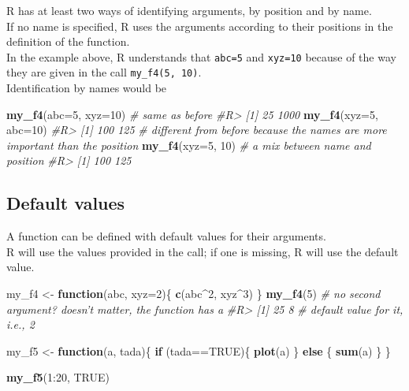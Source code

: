 \documentclass[]{book}
\newenvironment{Shaded}{}{}
\newcommand{\CommentTok}[1]{\textcolor[rgb]{0.38,0.63,0.69}{\textit{#1}}}
\newcommand{\ControlFlowTok}[1]{\textcolor[rgb]{0.00,0.44,0.13}{\textbf{#1}}}
\newcommand{\DataTypeTok}[1]{\textcolor[rgb]{0.56,0.13,0.00}{#1}}
\newcommand{\DecValTok}[1]{\textcolor[rgb]{0.25,0.63,0.44}{#1}}
\newcommand{\KeywordTok}[1]{\textcolor[rgb]{0.00,0.44,0.13}{\textbf{#1}}}
\newcommand{\NormalTok}[1]{#1}
\newcommand{\OperatorTok}[1]{\textcolor[rgb]{0.40,0.40,0.40}{#1}}
\newcommand{\OtherTok}[1]{\textcolor[rgb]{0.00,0.44,0.13}{#1}}
\newcommand{\StringTok}[1]{\textcolor[rgb]{0.25,0.44,0.63}{#1}}
\theoremstyle{definition}
\theoremstyle{definition}
\theoremstyle{definition}
\theoremstyle{remark}
\begin{document}
R has at least two ways of identifying arguments, by position and by
name.\\
If no name is specified, R uses the arguments according to their
positions in the definition of the function.\\
In the example above, R understands that \texttt{abc=5} and
\texttt{xyz=10} because of the way they are given in the call
\texttt{my\_f4(5,\ 10)}.\\
Identification by names would be

\begin{Shaded}
\begin{Highlighting}[]
\KeywordTok{my_f4}\NormalTok{(}\DataTypeTok{abc=}\DecValTok{5}\NormalTok{, }\DataTypeTok{xyz=}\DecValTok{10}\NormalTok{) }\CommentTok{# same as before}
\CommentTok{#R> [1]   25 1000}
\KeywordTok{my_f4}\NormalTok{(}\DataTypeTok{xyz=}\DecValTok{5}\NormalTok{, }\DataTypeTok{abc=}\DecValTok{10}\NormalTok{) }
\CommentTok{#R> [1] 100 125}
\CommentTok{# different from before because the names are more important than the position}
\KeywordTok{my_f4}\NormalTok{(}\DataTypeTok{xyz=}\DecValTok{5}\NormalTok{, }\DecValTok{10}\NormalTok{) }\CommentTok{# a mix between name and position }
\CommentTok{#R> [1] 100 125}
\end{Highlighting}
\end{Shaded}

\hypertarget{default-values}{%
\subsection{Default values}\label{default-values}}

A function can be defined with default values for their arguments.\\
R will use the values provided in the call; if one is missing, R will
use the default value.

\begin{Shaded}
\begin{Highlighting}[]

\NormalTok{my_f4 <-}\StringTok{ }\ControlFlowTok{function}\NormalTok{(abc, }\DataTypeTok{xyz=}\DecValTok{2}\NormalTok{)\{}
  \KeywordTok{c}\NormalTok{(abc}\OperatorTok{^}\DecValTok{2}\NormalTok{, xyz}\OperatorTok{^}\DecValTok{3}\NormalTok{)}
\NormalTok{\}}
\KeywordTok{my_f4}\NormalTok{(}\DecValTok{5}\NormalTok{) }\CommentTok{# no second argument? doesn't matter, the function has a }
\CommentTok{#R> [1] 25  8}
\CommentTok{# default value for it, i.e., 2}

\NormalTok{my_f5 <-}\StringTok{ }\ControlFlowTok{function}\NormalTok{(a, tada)\{}
  \ControlFlowTok{if}\NormalTok{ (tada}\OperatorTok{==}\OtherTok{TRUE}\NormalTok{)\{}
    \KeywordTok{plot}\NormalTok{(a)}
\NormalTok{  \} }\ControlFlowTok{else}\NormalTok{ \{}
    \KeywordTok{sum}\NormalTok{(a)}
\NormalTok{  \}}
\NormalTok{\}}


\KeywordTok{my_f5}\NormalTok{(}\DecValTok{1}\OperatorTok{:}\DecValTok{20}\NormalTok{, }\OtherTok{TRUE}\NormalTok{)}
\end{Highlighting}
\end{Shaded}
\end{document}
